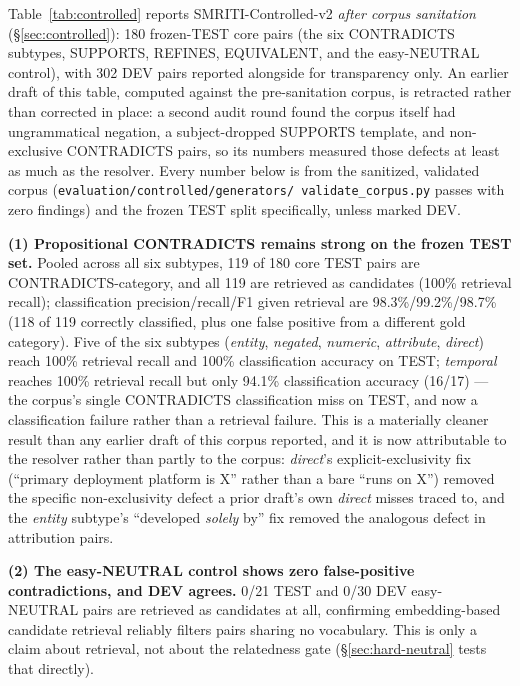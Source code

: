 

Table~\ref{tab:controlled} reports SMRITI-Controlled-v2 \emph{after
corpus sanitation} (\S\ref{sec:controlled}): 180 frozen-TEST core pairs
(the six CONTRADICTS subtypes, SUPPORTS, REFINES, EQUIVALENT, and the
easy-NEUTRAL control), with 302 DEV pairs reported alongside for
transparency only. An earlier draft of this table, computed against the
pre-sanitation corpus, is retracted rather than corrected in place: a
second audit round found the corpus itself had ungrammatical
negation, a subject-dropped SUPPORTS template, and non-exclusive
CONTRADICTS pairs, so its numbers measured those defects at least as
much as the resolver. Every number below is from the sanitized,
validated corpus (\texttt{evaluation/controlled/generators/
validate\_corpus.py} passes with zero findings) and the frozen TEST
split specifically, unless marked DEV.

\textbf{(1) Propositional CONTRADICTS remains strong on the frozen TEST
set.} Pooled across all six subtypes, 119 of 180 core TEST pairs are
CONTRADICTS-category, and all 119 are retrieved as candidates (100\%
retrieval recall); classification precision/recall/F1 given retrieval
are 98.3\%/99.2\%/98.7\% (118 of 119 correctly classified, plus one
false positive from a different gold category). Five of the six
subtypes (\emph{entity}, \emph{negated}, \emph{numeric},
\emph{attribute}, \emph{direct}) reach 100\% retrieval recall and 100\%
classification accuracy on TEST; \emph{temporal} reaches 100\% retrieval
recall but only 94.1\% classification accuracy (16/17) --- the corpus's
single CONTRADICTS classification miss on TEST, and now a
classification failure rather than a retrieval failure. This is a
materially cleaner result than any earlier draft of this corpus
reported, and it is now attributable to the resolver rather than partly
to the corpus: \emph{direct}'s explicit-exclusivity fix (``primary
deployment platform is X'' rather than a bare ``runs on X'') removed the
specific non-exclusivity defect a prior draft's own \emph{direct} misses
traced to, and the \emph{entity} subtype's ``developed \emph{solely}
by'' fix removed the analogous defect in attribution pairs.

\textbf{(2) The easy-NEUTRAL control shows zero false-positive
contradictions, and DEV agrees.} 0/21 TEST and 0/30 DEV easy-NEUTRAL
pairs are retrieved as candidates at all, confirming embedding-based
candidate retrieval reliably filters pairs sharing no vocabulary. This
is only a claim about retrieval, not about the relatedness gate
(\S\ref{sec:hard-neutral} tests that directly).

